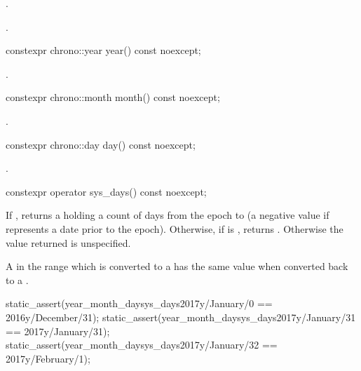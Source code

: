\begin{itemdescr}
\pnum
\effects
{}.

\pnum
\returns
{}.
\end{itemdescr}

%
\begin{itemdecl}
constexpr chrono::year year() const noexcept;
\end{itemdecl}

\begin{itemdescr}
\pnum
\returns
{}.
\end{itemdescr}

%
\begin{itemdecl}
constexpr chrono::month month() const noexcept;
\end{itemdecl}

\begin{itemdescr}
\pnum
\returns
{}.
\end{itemdescr}

%
\begin{itemdecl}
constexpr chrono::day day() const noexcept;
\end{itemdecl}

\begin{itemdescr}
\pnum
\returns
{}.
\end{itemdescr}

%
\begin{itemdecl}
constexpr operator sys_days() const noexcept;
\end{itemdecl}

\begin{itemdescr}
\pnum
\returns
If ,
returns a 
holding a count of days from the  epoch to 
(a negative value if  represents a date prior to the  epoch).
Otherwise, if  is ,
returns .
Otherwise the value returned is unspecified.

\pnum
\remarks
A  in the range 
which is converted to a 
has the same value when converted back to a .

\pnum
\begin{example}
\begin{codeblock}
static_assert(year_month_day{sys_days{2017y/January/0}}  == 2016y/December/31);
static_assert(year_month_day{sys_days{2017y/January/31}} == 2017y/January/31);
static_assert(year_month_day{sys_days{2017y/January/32}} == 2017y/February/1);
\end{codeblock}
\end{example}
\end{itemdescr}

